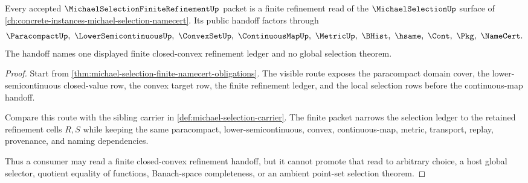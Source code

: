 \begin{theorem}
\label{thm:michael-selection-finite-sibling-boundary}
Every accepted $\MichaelSelectionFiniteRefinementUp$ packet is a finite refinement read of the $\MichaelSelectionUp$ surface of \autoref{ch:concrete-instances-michael-selection-namecert}. Its public handoff factors through
$$
\ParacompactUp,\ \LowerSemicontinuousUp,\ \ConvexSetUp,\ \ContinuousMapUp,\ \MetricUp,\ \BHist,\ \hsame,\ \Cont,\ \Pkg,\ \NameCert .
$$
The handoff names one displayed finite closed-convex refinement ledger and no global selection theorem.
\end{theorem}
\begin{proof}
Start from \autoref{thm:michael-selection-finite-namecert-obligations}. The visible route exposes the paracompact domain cover, the lower-semicontinuous closed-value row, the convex target row, the finite refinement ledger, and the local selection rows before the continuous-map handoff.

Compare this route with the sibling carrier in \autoref{def:michael-selection-carrier}. The finite packet narrows the selection ledger to the retained refinement cells $R,S$ while keeping the same paracompact, lower-semicontinuous, convex, continuous-map, metric, transport, replay, provenance, and naming dependencies.

Thus a consumer may read a finite closed-convex refinement handoff, but it cannot promote that read to arbitrary choice, a host global selector, quotient equality of functions, Banach-space completeness, or an ambient point-set selection theorem.
\end{proof}




